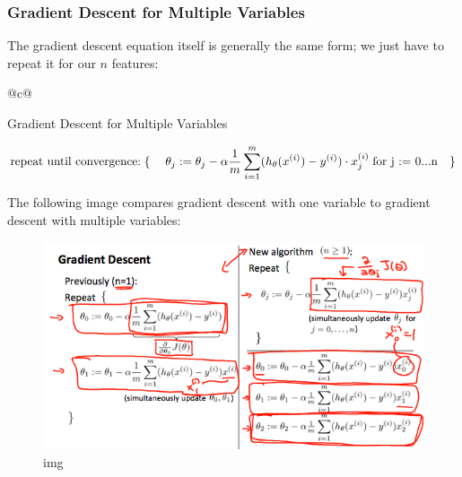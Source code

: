 \documentclass[11pt]{article}
\makeatletter
\def\maxwidth{\ifdim\Gin@nat@width>\linewidth\linewidth
    \else\Gin@nat@width\fi}
\let\Oldincludegraphics\includegraphics
\renewcommand{\includegraphics}[1]{\Oldincludegraphics[width=.8\maxwidth]{#1}}
\makeatother
\begin{document}
\hypertarget{gradient-descent-for-multiple-variables}{%
\subsubsection{\texorpdfstring{\textbf{Gradient Descent for Multiple
Variables}}{Gradient Descent for Multiple Variables}}\label{gradient-descent-for-multiple-variables}}

The gradient descent equation itself is generally the same form; we just
have to repeat it for our \(n\) features:

\begin{longtable}[]{@{}c@{}}
\toprule
\begin{minipage}[b]{0.97\columnwidth}\centering
Gradient Descent for Multiple Variables\strut
\end{minipage}\tabularnewline
\midrule
\endhead
\begin{minipage}[t]{0.97\columnwidth}\centering
\(\begin{aligned}& \text{repeat until convergence:} \; \lbrace \newline \; & \theta_j := \theta_j - \alpha \frac{1}{m} \sum\limits_{i=1}^{m}(h_\theta(x^{(i)}) - y^{(i)}) \cdot x_j^{(i)} \; & \text{for j := 0...n}\newline &\rbrace\end{aligned}\)\strut
\end{minipage}\tabularnewline
\bottomrule
\end{longtable}

The following image compares gradient descent with one variable to
gradient descent with multiple variables:

\begin{figure}
\centering
\includegraphics{./assets/MYm8uqafEeaZoQ7hPZtKqg_c974c2e2953662e9578b38c7b04591ed_Screenshot-2016-11-09-09.07.04.png}
\caption{img}
\end{figure}
\end{document}
